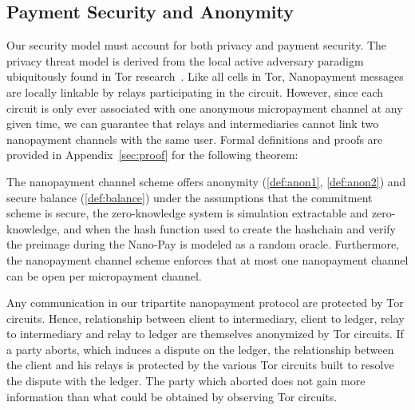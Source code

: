 \subsection{Payment Security and Anonymity}
\label{subsec:paysecurity}
Our security model must account for both privacy and payment security. The
privacy threat model is derived from the local active adversary paradigm
ubiquitously found in Tor research~\cite{dingledine2004tor}. Like all cells in
Tor, Nanopayment messages are locally linkable by relays participating in the
circuit. However, since each circuit is only ever associated with one anonymous
micropayment channel at any given time, we can guarantee that relays and
intermediaries cannot link two nanopayment channels with the same user. Formal
definitions and proofs are provided in Appendix~\ref{sec:proof} for the following theorem:

\begin{theorem}
  The nanopayment channel scheme offers anonymity
  (\ref{def:anon1}, \ref{def:anon2}) and secure balance (\ref{def:balance})
  under the assumptions that the commitment scheme is secure, the
  zero-knowledge system is simulation extractable and zero-knowledge,
  and when the hash function used to create the hashchain and verify
  the preimage during the Nano-Pay is  modeled as a random oracle.
%
    Furthermore, the nanopayment channel scheme enforces that at most one nanopayment channel can be open per micropayment channel. 


\end{theorem}

Any communication in
our tripartite nanopayment protocol are protected by Tor circuits. Hence,
relationship between client to intermediary, client to ledger, relay to
intermediary and relay to ledger are themselves anonymized by Tor circuits. If
a party aborts, which induces a dispute on the ledger, the relationship
between the client and his relays is protected by the various Tor circuits built
to resolve the dispute with the ledger. The party which aborted does not gain more information than what could be obtained by observing Tor circuits.

